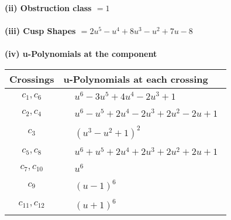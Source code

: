 \documentclass[1p]{elsarticle_modified}
\theoremstyle{definition}
\begin{document}
\flushleft \textbf{(ii) Obstruction class $= 1$}\\~\\
\flushleft \textbf{(iii) Cusp Shapes $= 2 u^5- u^4+8 u^3- u^2+7 u-8$}\\~\\
\newpage\renewcommand{\arraystretch}{1}
\flushleft \textbf{(iv) u-Polynomials at the component}\newline \\
\begin{tabular}{m{50pt}|m{274pt}}
Crossings & \hspace{64pt}u-Polynomials at each crossing \\
\hline $$\begin{aligned}c_{1},c_{6}\end{aligned}$$&$\begin{aligned}
&u^6-3 u^5+4 u^4-2 u^3+1
\end{aligned}$\\
\hline $$\begin{aligned}c_{2},c_{4}\end{aligned}$$&$\begin{aligned}
&u^6- u^5+2 u^4-2 u^3+2 u^2-2 u+1
\end{aligned}$\\
\hline $$\begin{aligned}c_{3}\end{aligned}$$&$\begin{aligned}
&(u^3- u^2+1)^2
\end{aligned}$\\
\hline $$\begin{aligned}c_{5},c_{8}\end{aligned}$$&$\begin{aligned}
&u^6+u^5+2 u^4+2 u^3+2 u^2+2 u+1
\end{aligned}$\\
\hline $$\begin{aligned}c_{7},c_{10}\end{aligned}$$&$\begin{aligned}
&u^6
\end{aligned}$\\
\hline $$\begin{aligned}c_{9}\end{aligned}$$&$\begin{aligned}
&(u-1)^6
\end{aligned}$\\
\hline $$\begin{aligned}c_{11},c_{12}\end{aligned}$$&$\begin{aligned}
&(u+1)^6
\end{aligned}$\\
\hline
\end{tabular}\\~\\
\end{document}
